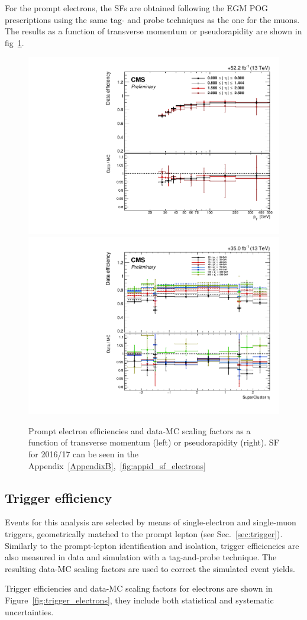 For the prompt electrons, the SFs are obtained following the EGM POG prescriptions using the same
tag- and probe techniques as the one for the muons. The results as a function of transverse momentum or pseudorapidity are shown in fig~\ref{fig:id_sf_electrons}.
\begin{figure}[h]
  \centering
   \includegraphics[width=.38\textwidth]{Figures/c6/efficiencies/ID_electrons/2018/leptonSF_SFvspT_HNLprompt.pdf}
\hspace{2cm}
  \includegraphics[width=.38\textwidth]{Figures/c6/efficiencies/ID_electrons/2016/leptonSF_SFvseta_HNLprompt.pdf}
  \caption{Prompt electron efficiencies and data-MC scaling factors as
    a function of transverse momentum (left) or pseudorapidity
    (right). SF for 2016/17 can be seen in the
  Appendix~\ref{AppendixB},~\ref{fig:appid_sf_electrons}}
  \label{fig:id_sf_electrons}
\end{figure}

\subsection{Trigger efficiency} \label{sec:triggereff}
Events for this analysis are selected by means of single-electron and
single-muon triggers, geometrically matched to the prompt lepton \lone
(see Sec.~\ref{sec:trigger}).
Similarly to the prompt-lepton identification and isolation,
trigger efficiencies are also measured in data and simulation with a
tag-and-probe technique. The resulting data-MC scaling factors are used to correct the
simulated event yields. 

Trigger efficiencies and data-MC scaling
factors for electrons are shown in Figure~\ref{fig:trigger_electrons},
they include both statistical and systematic uncertainties.

